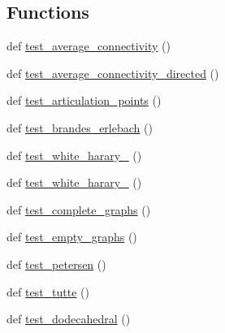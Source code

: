 \subsection*{Functions}
\begin{DoxyCompactItemize}
\item 
def \hyperlink{namespacenetworkx_1_1algorithms_1_1connectivity_1_1tests_1_1test__connectivity_ab8bbadfd6ad98da3c445aa1ef15b0d9a}{test\+\_\+average\+\_\+connectivity} ()
\item 
def \hyperlink{namespacenetworkx_1_1algorithms_1_1connectivity_1_1tests_1_1test__connectivity_a3e0b580e95951b5ae3ca2ab55ca4263c}{test\+\_\+average\+\_\+connectivity\+\_\+directed} ()
\item 
def \hyperlink{namespacenetworkx_1_1algorithms_1_1connectivity_1_1tests_1_1test__connectivity_a6d9fcf3f3d3c26262b873161b682bc6c}{test\+\_\+articulation\+\_\+points} ()
\item 
def \hyperlink{namespacenetworkx_1_1algorithms_1_1connectivity_1_1tests_1_1test__connectivity_aba7a57f4a7c74fcdb2b35fe8c386a9b6}{test\+\_\+brandes\+\_\+erlebach} ()
\item 
def \hyperlink{namespacenetworkx_1_1algorithms_1_1connectivity_1_1tests_1_1test__connectivity_a9336edca6b5eb2d251d09714e724752c}{test\+\_\+white\+\_\+harary\+\_} ()
\item 
def \hyperlink{namespacenetworkx_1_1algorithms_1_1connectivity_1_1tests_1_1test__connectivity_a8ac000396353867fd016272581dce7f0}{test\+\_\+white\+\_\+harary\+\_} ()
\item 
def \hyperlink{namespacenetworkx_1_1algorithms_1_1connectivity_1_1tests_1_1test__connectivity_a51a75ebbb5b692ccf7a80250fb65a57a}{test\+\_\+complete\+\_\+graphs} ()
\item 
def \hyperlink{namespacenetworkx_1_1algorithms_1_1connectivity_1_1tests_1_1test__connectivity_a026609cb50f2d811e5caaddc5648f4bc}{test\+\_\+empty\+\_\+graphs} ()
\item 
def \hyperlink{namespacenetworkx_1_1algorithms_1_1connectivity_1_1tests_1_1test__connectivity_aa8269c7da8064c3f12225ee76b8612a8}{test\+\_\+petersen} ()
\item 
def \hyperlink{namespacenetworkx_1_1algorithms_1_1connectivity_1_1tests_1_1test__connectivity_a3a3c10514e64f790c38882e21f851dfa}{test\+\_\+tutte} ()
\item 
def \hyperlink{namespacenetworkx_1_1algorithms_1_1connectivity_1_1tests_1_1test__connectivity_a5e1433a2408fea61c5d23c95a00b4766}{test\+\_\+dodecahedral} ()
\item 

\end{DoxyCompactItemize}
